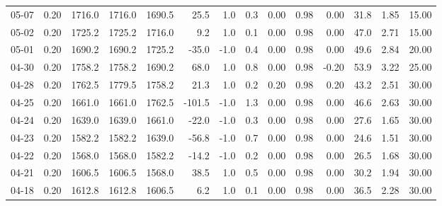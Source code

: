 \begin{threeparttable}
{\begin{tabular}{lrrrrrrrrrrrrr}
  05-07 &     0.20 & 1716.0 & 1716.0 & 1690.5 &       25.5 &                      1.0 &                 0.3 &       0.00 &      0.98 &           0.00 &             31.8 &            1.85 &                  15.00 \\
  05-02 &     0.20 & 1725.2 & 1725.2 & 1716.0 &        9.2 &                      1.0 &                 0.1 &       0.00 &      0.98 &           0.00 &             47.0 &            2.71 &                  15.00 \\
  05-01 &     0.20 & 1690.2 & 1690.2 & 1725.2 &      -35.0 &                     -1.0 &                 0.4 &       0.00 &      0.98 &           0.00 &             49.6 &            2.84 &                  20.00 \\
  04-30 &     0.20 & 1758.2 & 1758.2 & 1690.2 &       68.0 &                      1.0 &                 0.8 &       0.00 &      0.98 &          -0.20 &             53.9 &            3.22 &                  25.00 \\
  04-28 &     0.20 & 1762.5 & 1779.5 & 1758.2 &       21.3 &                      1.0 &                 0.2 &       0.20 &      0.98 &           0.20 &             43.2 &            2.51 &                  30.00 \\
  04-25 &     0.20 & 1661.0 & 1661.0 & 1762.5 &     -101.5 &                     -1.0 &                 1.3 &       0.00 &      0.98 &           0.00 &             46.6 &            2.63 &                  30.00 \\
  04-24 &     0.20 & 1639.0 & 1639.0 & 1661.0 &      -22.0 &                     -1.0 &                 0.3 &       0.00 &      0.98 &           0.00 &             27.6 &            1.65 &                  30.00 \\
  04-23 &     0.20 & 1582.2 & 1582.2 & 1639.0 &      -56.8 &                     -1.0 &                 0.7 &       0.00 &      0.98 &           0.00 &             24.6 &            1.51 &                  30.00 \\
  04-22 &     0.20 & 1568.0 & 1568.0 & 1582.2 &      -14.2 &                     -1.0 &                 0.2 &       0.00 &      0.98 &           0.00 &             26.5 &            1.68 &                  30.00 \\
  04-21 &     0.20 & 1606.5 & 1606.5 & 1568.0 &       38.5 &                      1.0 &                 0.5 &       0.00 &      0.98 &           0.00 &             30.2 &            1.94 &                  30.00 \\
  04-18 &     0.20 & 1612.8 & 1612.8 & 1606.5 &        6.2 &                      1.0 &                 0.1 &       0.00 &      0.98 &           0.00 &             36.5 &            2.28 &                  30.00 \\

\end{tabular}}
\end{threeparttable}
